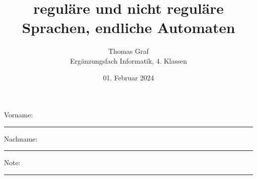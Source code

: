 \newtoggle{withbonus} \toggletrue{withbonus} %

\newcommand{\mycourse}{Ergänzungsfach Informatik}
\newcommand{\myclass}{4. Klassen}
\newcommand{\mydate}{01. Februar 2024}

\title{\textbf{reguläre und nicht reguläre Sprachen, endliche Automaten}}
\author{Thomas Graf\\
\mycourse, \myclass}
\date{\mydate}
\maketitle
\thispagestyle{headandfoot}		

\begin{center}
\end{center}
\vspace{10mm}

\begin{center}
	Vorname: \rule{45mm}{0.8pt}\qquad Nachname: \rule{45mm}{0.8pt}
\end{center}
\vspace{20mm}

\begin{center}
	\iftoggle{withbonus} {
		\combinedgradetable[h][questions]
	} {
		\gradetable[h][questions]
	}
\end{center}
\vspace{15mm}
\begin{center}
	Note: 
	\vspace{10mm}
	
	\rule{8mm}{1.2pt}
\end{center}
\clearpage

